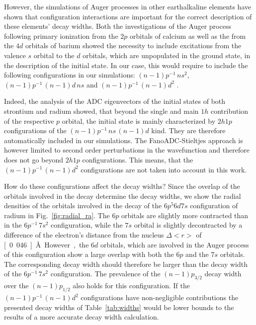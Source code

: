However, the simulations of Auger processes in other earthalkaline elements
have shown that configuration interactions are important for the correct
description of these elements' decay widths. Both the investigations of
the Auger process following primary ionization
from the $2p$ orbitals of calcium \cite{}
as well as the from the $4d$ orbitals of barium \cite{}
showed the necessity to include excitations from the valence $s$ orbital to
the $d$ orbitals, which are unpopulated in the ground state, in the
description of the initial state.
In our case, this would require to include the following configurations in our
simulations:
 $(n-1)p^{-1} \,ns^2$,
 $(n-1)p^{-1} \,(n-1)d \, ns$ and
 $(n-1)p^{-1} \,(n-1)d^2$ .    

Indeed, the analysis of the ADC eigenvectors of the initial states of both
strontium and radium showed,
that beyond the single and main $1h$ contribution of the respective $p$ orbital, the
initial state is mainly characterized by $2h1p$ configurations of the
$(n-1)p^{-1} \,ns \, (n-1)d$ kind. They
are therefore automatically included in our simulations.
The FanoADC-Stieltjes approach is however limited
to second order perturbations in the wavefunction
and therefore does not go beyond $2h1p$ configurations. This means, that the
$(n-1)p^{-1} \,(n-1)d^2$ configurations are not taken into account in this work.

How do these configurations affect the decay widths? Since the overlap of the
orbitals involved in the decay determine the decay widths, we show the
radial densities of the orbitals involved in the decay of the $6p^5 6d 7s$
configuration of radium in Fig.~\ref{fig:radial_ra}.
The $6p$ orbitals are slightly more contracted than in the $6p^{-1} \,7s^2$
configuration, while the $7s$ orbital is slightly decontracted by a difference
of the electron's distance from the nucleus $\Delta <r>$ of \unit[0.046]{\AA}.
However, the $6d$ orbitals, which are involved
in the Auger process of this configuration show a large overlap with both
the $6p$ and the $7s$ orbitals. The corresponding decay width should therefore
be larger than the decay width of the $6p^{-1} \,7s^2$ configuration.
The prevalence of the $(n-1)p_{3/2}$ decay width over the $(n-1)p_{1/2}$
also holds for this configuration.
If the $(n-1)p^{-1} \,(n-1)d^2$ configurations
have non-negligible contributions
the presented decay widths of Table~\ref{tab:widths} would be
lower bounds to the results of a more accurate decay width calculation.

